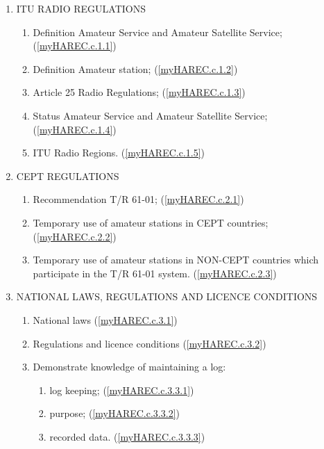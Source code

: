 \begin{enumerate}
\item ITU RADIO REGULATIONS
\begin{enumerate}
\item Definition Amateur Service and Amateur Satellite Service; (\ref{myHAREC.c.1.1})\label{HAREC.c.1.1}
\item Definition Amateur station; (\ref{myHAREC.c.1.2})\label{HAREC.c.1.2}
\item Article 25 Radio Regulations; (\ref{myHAREC.c.1.3})\label{HAREC.c.1.3}
\item Status Amateur Service and Amateur Satellite Service; (\ref{myHAREC.c.1.4})\label{HAREC.c.1.4}
\item ITU Radio Regions. (\ref{myHAREC.c.1.5})\label{HAREC.c.1.5}
\end{enumerate}
\item CEPT REGULATIONS
\begin{enumerate}
\item Recommendation T/R 61-01; (\ref{myHAREC.c.2.1})\label{HAREC.c.2.1}
\item Temporary use of amateur stations in CEPT countries; (\ref{myHAREC.c.2.2})\label{HAREC.c.2.2}
\item Temporary use of amateur stations in NON-CEPT countries which participate in the T/R 61-01 system. (\ref{myHAREC.c.2.3})\label{HAREC.c.2.3}
\end{enumerate}
\item NATIONAL LAWS, REGULATIONS AND LICENCE CONDITIONS
\begin{enumerate}
\item National laws (\ref{myHAREC.c.3.1})\label{HAREC.c.3.1}
\item Regulations and licence conditions (\ref{myHAREC.c.3.2})\label{HAREC.c.3.2}
\item Demonstrate knowledge of maintaining a log:
\begin{enumerate}
\item log keeping; (\ref{myHAREC.c.3.3.1})\label{HAREC.c.3.3.1}
\item purpose; (\ref{myHAREC.c.3.3.2})\label{HAREC.c.3.3.2}
\item recorded data. (\ref{myHAREC.c.3.3.3})\label{HAREC.c.3.3.3}
\end{enumerate}
\end{enumerate}
\end{enumerate}
